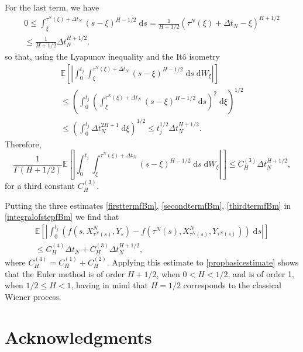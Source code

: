\documentclass[reqno,12pt]{amsart}
\theoremstyle{plain}%
\theoremstyle{definition}
\begin{document}
For the last term, we have
\begin{multline*}
    0 \leq \int_\xi^{\tau^N(\xi) + \Delta t_N} (s - \xi)^{H-1/2} \;\mathrm{d}s = \frac{1}{H + 1/2} (\tau^N(\xi) + \Delta t_N - \xi)^{H + 1/2} \\
    \leq \frac{1}{H + 1/2} \Delta t_N^{H + 1/2}.
\end{multline*}
so that, using the Lyapunov inequality and the It\^o isometry
\begin{multline*}
    \mathbb{E}\left[\left|\int_0^{t_j} \int_\xi^{\tau^N(\xi) + \Delta t_N} (s - \xi)^{H-1/2} \;\mathrm{d}s \;\mathrm{d}W_\xi\right|\right] \\
    \leq \left( \int_0^{t_j} \left(\int_\xi^{\tau^N(\xi) + \Delta t_N} (s - \xi)^{H-1/2} \;\mathrm{d}s\right)^2 \;\mathrm{d}\xi\right)^{1/2} \\ 
    \leq \left( \int_0^{t_j} \Delta t_N^{2H + 1} \;\mathrm{d}\xi\right)^{1/2} \leq t_j^{1/2} \Delta t_N^{H + 1/2}.
\end{multline*}
Therefore,
\begin{equation}
    \label{thirdtermfBm}
    \frac{1}{\Gamma(H + 1/2)}\mathbb{E}\left[\left|\int_0^{t_j} \int_\xi^{\tau^N(\xi) + \Delta t_N} (s - \xi)^{H-1/2} \;\mathrm{d}s \;\mathrm{d}W_\xi\right|\right] \leq C_H^{(3)} \Delta t_N^{H + 1/2},
\end{equation}
for a third constant $C_H^{(3)}$.

Putting the three estimates \eqref{firsttermfBm}, \eqref{secondtermfBm}, \eqref{thirdtermfBm} in \eqref{integralofstepfBm} we find that
\begin{multline}
    \mathbb{E}\left[\left|\int_0^{t_j} \left( f(s, X_{\tau^N(s)}^N, Y_s) - f(\tau^N(s), X_{\tau^N(s)}^N, Y_{\tau^N(s)}) \right)\;\mathrm{d}s\right|\right] \\
    \leq C_H^{(4)} \Delta t_N + C_H^{(3)} \Delta t_N^{H + 1/2},
\end{multline}
where $C_H^{(4)} = C_H^{(1)} + C_H^{(2)}$. Applying this estimate to \cref{propbasicestimate} shows that the Euler method is of order $H + 1/2$, when $0 < H < 1/2$, and is of order 1, when $1/2 \leq H < 1$, having in mind that $H=1/2$ corresponds to the classical Wiener process.

\section*{Acknowledgments}
\end{document}
